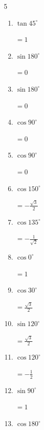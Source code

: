 \begin{multicols}{5}
\begin{enumerate}
        $\displaystyle =\frac{1}{2}$

  \item $\displaystyle \tan{45^\circ}$

        $\displaystyle =1$

  \item $\displaystyle \sin{180^\circ}$

        $\displaystyle =0$

\columnbreak %

  \item $\displaystyle \sin{180^\circ}$

        $\displaystyle =0$

  \item $\displaystyle \cos{90^\circ}$

        $\displaystyle =0$

  \item $\displaystyle \cos{90^\circ}$

        $\displaystyle =0$

  \item $\displaystyle \cos{150^\circ}$

        $\displaystyle =-\frac{\sqrt{3}}{2}$

  \item $\displaystyle \cos{135^\circ}$

        $\displaystyle =-\frac{1}{\sqrt{2}}$

  \item $\displaystyle \cos{0^\circ}$

        $\displaystyle =1$

  \item $\displaystyle \cos{30^\circ}$

        $\displaystyle =\frac{\sqrt{3}}{2}$

  \item $\displaystyle \sin{120^\circ}$

        $\displaystyle =\frac{\sqrt{3}}{2}$

  \item $\displaystyle \cos{120^\circ}$

        $\displaystyle =-\frac{1}{2}$

  \item $\displaystyle \sin{90^\circ}$

        $\displaystyle =1$

  \item $\displaystyle \cos{180^\circ}$


\end{enumerate}
\end{multicols}
